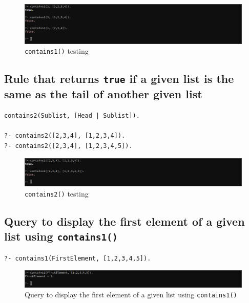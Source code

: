 \documentclass[a4paper]{article}
\begin{document}
\begin{figure}[H]
    \includegraphics[width=\textwidth]{./images/q2_3.png}
    \caption{\texttt{contains1()} testing}
\end{figure}

\subsection{Rule that returns \texttt{true} if a given list is the same as the tail of another given list}
\begin{verbatim}
contains2(Sublist, [Head | Sublist]).

?- contains2([2,3,4], [1,2,3,4]).
?- contains2([2,3,4], [1,2,3,4,5]).
\end{verbatim}

\begin{figure}[H]
    \includegraphics[width=\textwidth]{./images/q2_4.png}
    \caption{\texttt{contains2()} testing}
\end{figure}

\subsection{Query to display the first element of a given list using \texttt{contains1()}}
\begin{verbatim}
?- contains1(FirstElement, [1,2,3,4,5]).
\end{verbatim}

\begin{figure}[H]
    \includegraphics[width=\textwidth]{./images/q2_5.png}
    \caption{Query to display the first element of a given list using \texttt{contains1()}}
\end{figure}
\end{document}
